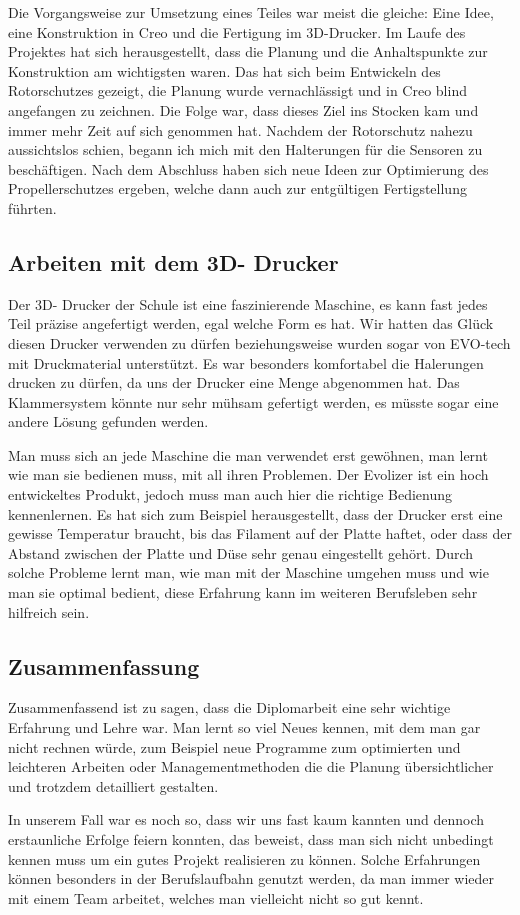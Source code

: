 	Die Vorgangsweise zur Umsetzung eines Teiles war meist die gleiche: Eine Idee, eine Konstruktion in Creo und die Fertigung im 3D-Drucker.
	Im Laufe des Projektes hat sich herausgestellt, dass die Planung und die Anhaltspunkte zur Konstruktion am wichtigsten waren.
	Das hat sich beim Entwickeln des Rotorschutzes gezeigt, die Planung wurde vernachlässigt und in Creo blind angefangen zu zeichnen.
	Die Folge war, dass dieses Ziel ins Stocken kam und immer mehr Zeit auf sich genommen hat.
	Nachdem der Rotorschutz nahezu aussichtslos schien, begann ich mich mit den Halterungen für die Sensoren zu beschäftigen.
	Nach dem Abschluss haben sich neue Ideen zur Optimierung des Propellerschutzes ergeben, welche dann auch zur entgültigen Fertigstellung führten.

	\subsection{Arbeiten mit dem 3D- Drucker}

	Der 3D- Drucker der Schule ist eine faszinierende Maschine, es kann fast jedes Teil präzise angefertigt werden, egal welche Form es hat.
	Wir hatten das Glück diesen Drucker verwenden zu dürfen beziehungsweise wurden sogar von EVO-tech mit Druckmaterial unterstützt.
	Es war besonders komfortabel die Halerungen drucken zu dürfen, da uns der Drucker eine Menge abgenommen hat.
	Das Klammersystem könnte nur sehr mühsam gefertigt werden, es müsste sogar eine andere Lösung gefunden werden.

	Man muss sich an jede Maschine die man verwendet erst gewöhnen, man lernt wie man sie bedienen muss, mit all ihren Problemen.
	Der Evolizer ist ein hoch entwickeltes Produkt, jedoch muss man auch hier die richtige Bedienung kennenlernen.
	Es hat sich zum Beispiel herausgestellt, dass der Drucker erst eine gewisse Temperatur braucht, bis das Filament auf der Platte haftet, oder dass der Abstand zwischen der Platte und Düse sehr genau eingestellt gehört.
	Durch solche Probleme lernt man, wie man mit der Maschine umgehen muss und wie man sie optimal bedient, diese Erfahrung kann im weiteren Berufsleben sehr hilfreich sein.

			\newpage

	\subsection{Zusammenfassung}

	Zusammenfassend ist zu sagen, dass die Diplomarbeit eine sehr wichtige Erfahrung und Lehre war.
	Man lernt so viel Neues kennen, mit dem man gar nicht rechnen würde, zum Beispiel neue Programme zum optimierten und leichteren Arbeiten oder Managementmethoden die die Planung übersichtlicher und trotzdem detailliert gestalten.

 	In unserem Fall war es noch so, dass wir uns fast kaum kannten und dennoch erstaunliche Erfolge feiern konnten,
	das beweist, dass man sich nicht unbedingt kennen muss um ein gutes Projekt realisieren zu können. Solche Erfahrungen können besonders in der Berufslaufbahn genutzt werden,
	da man immer wieder mit einem Team arbeitet, welches man vielleicht nicht so gut kennt.
